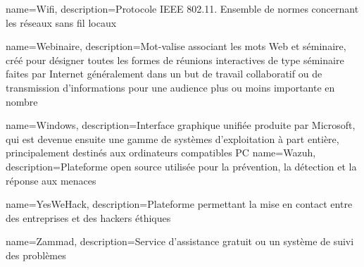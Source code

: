 {
    name=Wifi,
    description={Protocole IEEE 802.11. Ensemble de normes concernant les réseaux sans fil locaux}
}

{
    name=Webinaire,
    description={Mot-valise associant les mots Web et séminaire, créé pour désigner toutes les formes de réunions interactives de type séminaire faites par Internet généralement dans un but de travail collaboratif ou de transmission d'informations pour une audience plus ou moins importante en nombre}
}


{
    name=Windows,
    description={Interface graphique unifiée produite par Microsoft, qui est devenue ensuite une gamme de systèmes d’exploitation à part entière, principalement destinés aux ordinateurs compatibles PC}
}
{
    name=Wazuh,
    description={Plateforme open source utilisée pour la prévention, la détection et la réponse aux menaces}
}


{
    name=YesWeHack,
    description={Plateforme permettant la mise en contact entre des entreprises et des hackers éthiques}
}

{
    name=Zammad,
    description={Service d'assistance gratuit ou un système de suivi des problèmes}
}

































